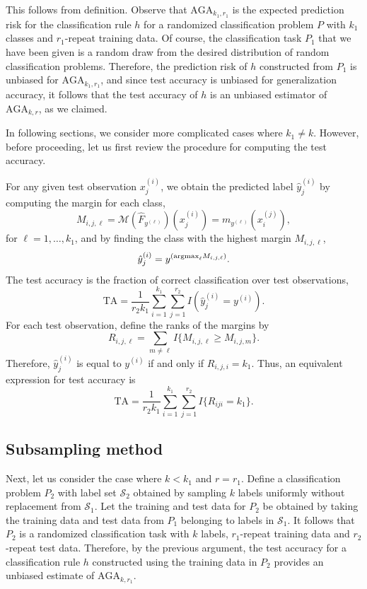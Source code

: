This follows from definition.  Observe that $\text{AGA}_{k_1,r_1}$ is
the expected prediction risk for the classification rule $h$ for a
randomized classification problem $P$ with $k_1$ classes and
$r_1$-repeat training data.  Of course, the classification task $P_1$
that we have been given is a random draw from the desired
distribution of random classification problems.  Therefore, the
prediction risk of $h$ constructed from $P_1$ is unbiased for
$\text{AGA}_{k_1, r_1}$, and since test accuracy is unbiased for
generalization accuracy, it follows that the test accuracy of $h$ is
an unbiased estimator of $\text{AGA}_{k,r}$, as we claimed.

In following sections, we consider more complicated cases where $k_1
\neq k$.  However, before proceeding, let us first review the
procedure for computing the test accuracy.

For any given test observation $x_j^{(i)}$, we obtain the predicted
label $\hat{y}_j^{(i)}$ by computing the margin for each class,
\[
M_{i,j,\ell} = \mathcal{M}(\hat{F}_{y^{(\ell)}})(x_j^{(i)}) =  m_{y^{(\ell)}}(x_i^{(j)}),
\]
for $\ell = 1,\hdots, k_1$,
and by finding the class with the highest margin $M_{i, j, \ell}$,
\[
\hat{y}_j^{(i)} = y^{(\text{argmax}_\ell M_{i, j, \ell})}.
\]
The test accuracy is the fraction of correct classification over test observations,
\begin{equation}
\text{TA} = \frac{1}{r_2k_1} \sum_{i=1}^{k_1} \sum_{j=1}^{r_2} I(\hat{y}_j^{(i)} = y^{(i)}).
\end{equation}
For each test observation, define the ranks of the margins by
\[
R_{i,j,\ell} = \sum_{m \neq \ell} I\{M_{i,j,\ell} \geq M_{i, j, m}\}.
\]
Therefore, $\hat{y}_j^{(i)}$ is equal to $y^{(i)}$ if and only if $R_{i,j,i} = k_1$.
Thus, an equivalent expression for test accuracy is
\begin{equation}\label{eq:test_risk}
\text{TA} = \frac{1}{r_2 k_1} \sum_{i=1}^{k_1} \sum_{j=1}^{r_2} I\{R_{iji} = k_1\}.
\end{equation}

\subsection{Subsampling method}

Next, let us consider the case where $k < k_1$ and $r=r_1$.  Define a
classification problem $P_2$ with label set $\mathcal{S}_2$ obtained
by sampling $k$ labels uniformly without replacement from
$\mathcal{S}_1$.  Let the training and test data for $P_2$ be obtained
by taking the training data and test data from $P_1$ belonging to
labels in $\mathcal{S}_1$.  It follows that $P_2$ is a randomized
classification task with $k$ labels, $r_1$-repeat training data and
$r_2$-repeat test data.  Therefore, by the previous argument, the test
accuracy for a classification rule $h$ constructed using the training data
in $P_2$ provides an unbiased estimate of $\text{AGA}_{k, r_1}$.

